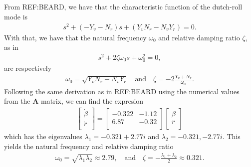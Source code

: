 \subsection{}
From REF:BEARD, we have that the characteristic function of the dutch-roll mode is
\begin{equation}\begin{aligned}
s^2 + (-Y_v - N_r)s + (Y_vN_r - N_vY_r) = 0.
\end{aligned}\end{equation}
With that, we have that the natural frequency $\omega_0$ and relative damping ratio $\zeta$, as in
\begin{equation}\begin{aligned}
s^2 + 2\zeta \omega_0 s + \omega_0^2 = 0,
\end{aligned}\end{equation}
are respectively
\begin{equation}\begin{aligned}
\label{eq:freqanddamp}
\omega_0 = \sqrt{Y_v N_r - N_v Y_r} \quad \text{and} \quad \zeta = -2\frac{Y_v + N_r}{\omega_0}.
\end{aligned}\end{equation}
Following the same derivation as in REF:BEARD using the numerical values from the $\mathbf{A}$ matrix, we can find the expresion
\begin{equation}\begin{aligned}
\begin{bmatrix}
\dot \beta\\
\dot r\\
\end{bmatrix}
=
\begin{bmatrix}
-0.322 & -1.12 \\
6.87 & -0.32 \\
\end{bmatrix}
\begin{bmatrix}
\beta\\
r\\
\end{bmatrix}
\end{aligned}\end{equation}
which has the eigenvalues $\lambda_1 = -0.321 + 2.77i$ and $\lambda_2 = -0.321, - 2.77i$. This yields the natural frequency and relative damping ratio
\begin{equation}\begin{aligned}
\omega_0 = \sqrt{\lambda_1 \lambda_2} \approx 2.79, \quad \text{and} \quad \zeta = -\frac{\lambda_1 + \lambda_2}{2} \approx 0.321.
\end{aligned}\end{equation}

